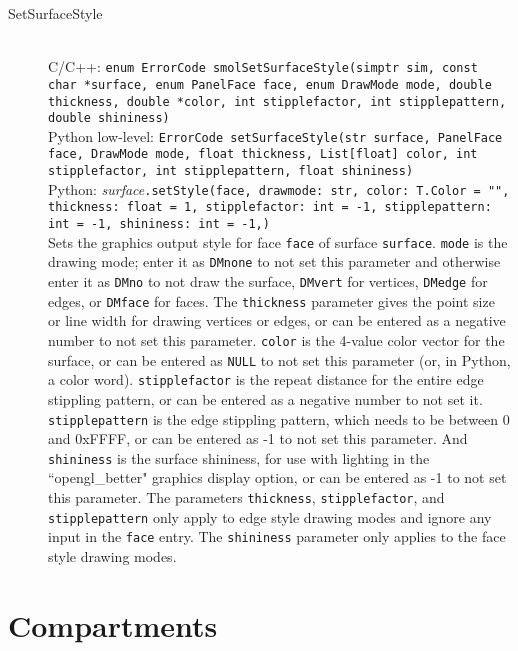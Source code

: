 \documentclass {book}
\newcommand {\ttt} {\texttt}
\begin{document}
\begin{description}
\item[SetSurfaceStyle]
\hfill \\
C/C++: \ttt{enum ErrorCode smolSetSurfaceStyle(simptr sim, const char *surface, enum PanelFace face, enum DrawMode mode, double thickness, double *color, int stipplefactor, int stipplepattern, double shininess)}\\
Python low-level: \ttt{ErrorCode setSurfaceStyle(str surface, PanelFace face, DrawMode mode, float thickness, List[float] color, int stipplefactor, int stipplepattern, float shininess)}\\
Python: \textit{surface}\ttt{.setStyle(face, drawmode: str, color: T.Color = "", thickness: float = 1, stipplefactor: int = -1, stipplepattern: int = -1, shininess: int = -1,)}\\
Sets the graphics output style for face \ttt{face} of surface \ttt{surface}. \ttt{mode} is the drawing mode; enter it as \ttt{DMnone} to not set this parameter and otherwise enter it as \ttt{DMno} to not draw the surface, \ttt{DMvert} for vertices, \ttt{DMedge} for edges, or \ttt{DMface} for faces. The \ttt{thickness} parameter gives the point size or line width for drawing vertices or edges, or can be entered as a negative number to not set this parameter. \ttt{color} is the 4-value color vector for the surface, or can be entered as \ttt{NULL} to not set this parameter (or, in Python, a color word). \ttt{stipplefactor} is the repeat distance for the entire edge stippling pattern, or can be entered as a negative number to not set it. \ttt{stipplepattern} is the edge stippling pattern, which needs to be between 0 and 0xFFFF, or can be entered as -1 to not set this parameter. And \ttt{shininess} is the surface shininess, for use with lighting in the ``opengl\_better" graphics display option, or can be entered as -1 to not set this parameter. The parameters \ttt{thickness}, \ttt{stipplefactor}, and \ttt{stipplepattern} only apply to edge style drawing modes and ignore any input in the \ttt{face} entry. The \ttt{shininess} parameter only applies to the face style drawing modes.

\end{description}

\section{Compartments}
\end{document}
